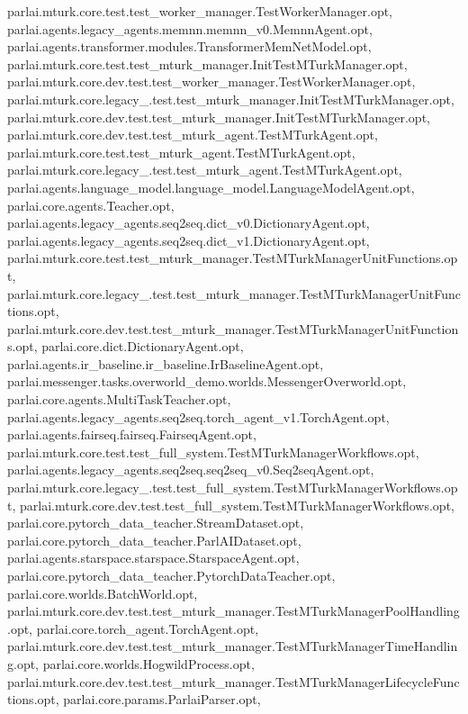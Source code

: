 parlai.\+mturk.\+core.\+test.\+test\+\_\+worker\+\_\+manager.\+Test\+Worker\+Manager.\+opt, parlai.\+agents.\+legacy\+\_\+agents.\+memnn.\+memnn\+\_\+v0.\+Memnn\+Agent.\+opt, parlai.\+agents.\+transformer.\+modules.\+Transformer\+Mem\+Net\+Model.\+opt, parlai.\+mturk.\+core.\+test.\+test\+\_\+mturk\+\_\+manager.\+Init\+Test\+M\+Turk\+Manager.\+opt, parlai.\+mturk.\+core.\+dev.\+test.\+test\+\_\+worker\+\_\+manager.\+Test\+Worker\+Manager.\+opt, parlai.\+mturk.\+core.\+legacy\+\_.\+test.\+test\+\_\+mturk\+\_\+manager.\+Init\+Test\+M\+Turk\+Manager.\+opt, parlai.\+mturk.\+core.\+dev.\+test.\+test\+\_\+mturk\+\_\+manager.\+Init\+Test\+M\+Turk\+Manager.\+opt, parlai.\+mturk.\+core.\+dev.\+test.\+test\+\_\+mturk\+\_\+agent.\+Test\+M\+Turk\+Agent.\+opt, parlai.\+mturk.\+core.\+test.\+test\+\_\+mturk\+\_\+agent.\+Test\+M\+Turk\+Agent.\+opt, parlai.\+mturk.\+core.\+legacy\+\_.\+test.\+test\+\_\+mturk\+\_\+agent.\+Test\+M\+Turk\+Agent.\+opt, parlai.\+agents.\+language\+\_\+model.\+language\+\_\+model.\+Language\+Model\+Agent.\+opt, parlai.\+core.\+agents.\+Teacher.\+opt, parlai.\+agents.\+legacy\+\_\+agents.\+seq2seq.\+dict\+\_\+v0.\+Dictionary\+Agent.\+opt, parlai.\+agents.\+legacy\+\_\+agents.\+seq2seq.\+dict\+\_\+v1.\+Dictionary\+Agent.\+opt, parlai.\+mturk.\+core.\+test.\+test\+\_\+mturk\+\_\+manager.\+Test\+M\+Turk\+Manager\+Unit\+Functions.\+opt, parlai.\+mturk.\+core.\+legacy\+\_.\+test.\+test\+\_\+mturk\+\_\+manager.\+Test\+M\+Turk\+Manager\+Unit\+Functions.\+opt, parlai.\+mturk.\+core.\+dev.\+test.\+test\+\_\+mturk\+\_\+manager.\+Test\+M\+Turk\+Manager\+Unit\+Functions.\+opt, parlai.\+core.\+dict.\+Dictionary\+Agent.\+opt, parlai.\+agents.\+ir\+\_\+baseline.\+ir\+\_\+baseline.\+Ir\+Baseline\+Agent.\+opt, parlai.\+messenger.\+tasks.\+overworld\+\_\+demo.\+worlds.\+Messenger\+Overworld.\+opt, parlai.\+core.\+agents.\+Multi\+Task\+Teacher.\+opt, parlai.\+agents.\+legacy\+\_\+agents.\+seq2seq.\+torch\+\_\+agent\+\_\+v1.\+Torch\+Agent.\+opt, parlai.\+agents.\+fairseq.\+fairseq.\+Fairseq\+Agent.\+opt, parlai.\+mturk.\+core.\+test.\+test\+\_\+full\+\_\+system.\+Test\+M\+Turk\+Manager\+Workflows.\+opt, parlai.\+agents.\+legacy\+\_\+agents.\+seq2seq.\+seq2seq\+\_\+v0.\+Seq2seq\+Agent.\+opt, parlai.\+mturk.\+core.\+legacy\+\_.\+test.\+test\+\_\+full\+\_\+system.\+Test\+M\+Turk\+Manager\+Workflows.\+opt, parlai.\+mturk.\+core.\+dev.\+test.\+test\+\_\+full\+\_\+system.\+Test\+M\+Turk\+Manager\+Workflows.\+opt, parlai.\+core.\+pytorch\+\_\+data\+\_\+teacher.\+Stream\+Dataset.\+opt, parlai.\+core.\+pytorch\+\_\+data\+\_\+teacher.\+Parl\+A\+I\+Dataset.\+opt, parlai.\+agents.\+starspace.\+starspace.\+Starspace\+Agent.\+opt, parlai.\+core.\+pytorch\+\_\+data\+\_\+teacher.\+Pytorch\+Data\+Teacher.\+opt, parlai.\+core.\+worlds.\+Batch\+World.\+opt, parlai.\+mturk.\+core.\+dev.\+test.\+test\+\_\+mturk\+\_\+manager.\+Test\+M\+Turk\+Manager\+Pool\+Handling.\+opt, parlai.\+core.\+torch\+\_\+agent.\+Torch\+Agent.\+opt, parlai.\+mturk.\+core.\+dev.\+test.\+test\+\_\+mturk\+\_\+manager.\+Test\+M\+Turk\+Manager\+Time\+Handling.\+opt, parlai.\+core.\+worlds.\+Hogwild\+Process.\+opt, parlai.\+mturk.\+core.\+dev.\+test.\+test\+\_\+mturk\+\_\+manager.\+Test\+M\+Turk\+Manager\+Lifecycle\+Functions.\+opt, parlai.\+core.\+params.\+Parlai\+Parser.\+opt, 